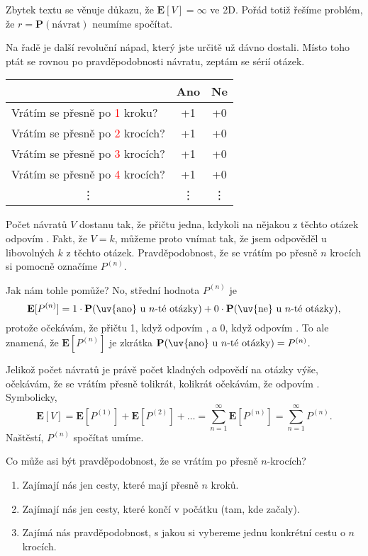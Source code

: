 \documentclass[a4paper,11pt]{article}
\theoremstyle{remark}
\renewcommand{\P}{\mathbf{P}}
\newcommand{\E}{\mathbf{E}}
\begin{document}
Zbytek textu se věnuje důkazu, že $\E[V] = \infty$ ve 2D. Pořád totiž řešíme
problém, že $r = \P(\text{návrat})$ neumíme spočítat.

Na řadě je další revoluční nápad, který jste určitě už dávno dostali. Místo
toho ptát se rovnou po pravděpodobnosti návratu, zeptám se sérií otázek.

\begin{center}
 \begin{tabular}{lcc}
  & Ano & Ne \\
  \midrule
  Vrátím se přesně po \textcolor{red}{1} kroku? & +1 & +0 \\
  Vrátím se přesně po \textcolor{red}{2} krocích? & +1 & +0 \\
  Vrátím se přesně po \textcolor{red}{3} krocích? & +1 & +0 \\
  Vrátím se přesně po \textcolor{red}{4} krocích? & +1 & +0 \\
  \multicolumn{1}{c}{\vdots} & \vdots & \vdots
 \end{tabular}
\end{center}

Počet návratů $V$ dostanu tak, že přičtu jedna, kdykoli na nějakou z těchto
otázek odpovím . Fakt, že $V = k$, můžeme proto vnímat tak, že jsem
 odpověděl u libovolných $k$ z těchto otázek. Pravděpodobnost, že se
vrátím po přesně $n$ krocích si pomocně označíme $P^{(n)}$.

Jak nám tohle pomůže? No, střední hodnota $P^{(n)}$ je
\[
 \E[P^{(n)}] = 1 \cdot \P(\text{\uv{ano} u $n$-té otázky}) + 0 \cdot
 \P(\text{\uv{ne} u $n$-té otázky}),
\]
protože očekávám, že přičtu 1, když odpovím , a 0, když odpovím .
To ale znamená, že $\E[P^{(n)}]$ je zkrátka $\P(\text{\uv{ano} u $n$-té
otázky}) = P^{(n)}$.

Jelikož počet návratů je právě počet kladných odpovědí na otázky výše, očekávám,
že se vrátím přesně tolikrát, kolikrát očekávám, že odpovím .
Symbolicky,
\[
 \E[V] = \E[P^{(1)}] + \E[P^{(2)}] +\ldots = \sum_{n=1}^{\infty} \E[P^{(n)}] =
 \sum_{n=1}^{\infty} P^{(n)}.
\]
Naštěstí, $P^{(n)}$ spočítat umíme.

Co může asi být pravděpodobnost, že se vrátím po přesně $n$-krocích?
\begin{enumerate}[label=\arabic*.,topsep=0pt]
 \item Zajímají nás jen cesty, které mají přesně $n$ kroků.
 \item Zajímají nás jen cesty, které končí v počátku (tam, kde začaly).
 \item Zajímá nás pravděpodobnost, s jakou si vybereme jednu konkrétní cestu o
  $n$ krocích.
\end{enumerate}
\end{document}
